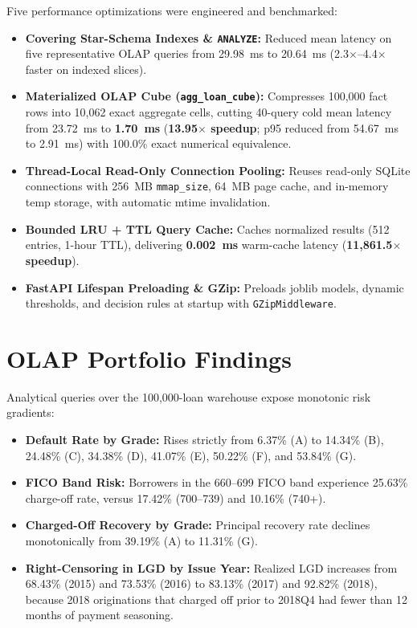 \documentclass[conference]{IEEEtran}
\begin{document}
Five performance optimizations were engineered and benchmarked:
\begin{itemize}
\item \textbf{Covering Star-Schema Indexes \& \texttt{ANALYZE}:} Reduced mean latency on five representative OLAP queries from 29.98~ms to 20.64~ms (2.3$\times$--4.4$\times$ faster on indexed slices).
\item \textbf{Materialized OLAP Cube (\texttt{agg\_loan\_cube}):} Compresses 100,000 fact rows into 10,062 exact aggregate cells, cutting 40-query cold mean latency from 23.72~ms to \textbf{1.70~ms} (\textbf{13.95$\times$ speedup}; p95 reduced from 54.67~ms to 2.91~ms) with 100.0\% exact numerical equivalence.
\item \textbf{Thread-Local Read-Only Connection Pooling:} Reuses read-only SQLite connections with 256~MB \texttt{mmap\_size}, 64~MB page cache, and in-memory temp storage, with automatic mtime invalidation.
\item \textbf{Bounded LRU + TTL Query Cache:} Caches normalized results (512 entries, 1-hour TTL), delivering \textbf{0.002~ms} warm-cache latency (\textbf{11,861.5$\times$ speedup}).
\item \textbf{FastAPI Lifespan Preloading \& GZip:} Preloads joblib models, dynamic thresholds, and decision rules at startup with \texttt{GZipMiddleware}.
\end{itemize}

\section{OLAP Portfolio Findings}
Analytical queries over the 100,000-loan warehouse expose monotonic risk gradients:
\begin{itemize}
\item \textbf{Default Rate by Grade:} Rises strictly from 6.37\% (A) to 14.34\% (B), 24.48\% (C), 34.38\% (D), 41.07\% (E), 50.22\% (F), and 53.84\% (G).
\item \textbf{FICO Band Risk:} Borrowers in the 660--699 FICO band experience 25.63\% charge-off rate, versus 17.42\% (700--739) and 10.16\% (740+).
\item \textbf{Charged-Off Recovery by Grade:} Principal recovery rate declines monotonically from 39.19\% (A) to 11.31\% (G).
\item \textbf{Right-Censoring in LGD by Issue Year:} Realized LGD increases from 68.43\% (2015) and 73.53\% (2016) to 83.13\% (2017) and 92.82\% (2018), because 2018 originations that charged off prior to 2018Q4 had fewer than 12 months of payment seasoning.
\end{itemize}
\end{document}
